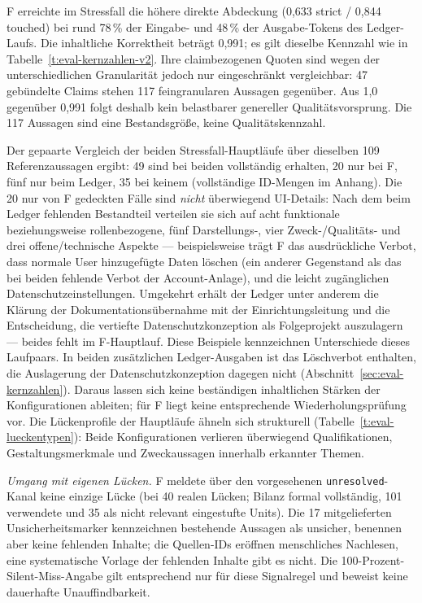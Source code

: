 F erreichte im Stressfall die höhere direkte Abdeckung
(0{,}633 strict / 0{,}844 touched) bei rund 78\,\% der Eingabe-
und 48\,\% der Ausgabe-Tokens des Ledger-Laufs. Die inhaltliche
Korrektheit beträgt 0{,}991; es gilt dieselbe Kennzahl wie in
Tabelle~\ref{t:eval-kernzahlen-v2}. Ihre claimbezogenen Quoten sind
wegen der unterschiedlichen Granularität jedoch nur eingeschränkt
vergleichbar: 47 gebündelte Claims stehen 117 feingranularen Aussagen
gegenüber. Aus 1{,}0 gegenüber 0{,}991 folgt deshalb kein belastbarer
genereller Qualitätsvorsprung. Die 117 Aussagen sind eine
Bestandsgröße, keine Qualitätskennzahl.

Der gepaarte Vergleich der beiden Stressfall-Hauptläufe über dieselben
109 Referenzaussagen ergibt: 49 sind bei beiden vollständig erhalten,
20 nur bei F, fünf nur beim Ledger, 35 bei keinem (vollständige
ID-Mengen im Anhang). Die 20 nur von F gedeckten Fälle sind
\emph{nicht} überwiegend UI-Details: Nach dem beim Ledger
fehlenden Bestandteil verteilen sie sich auf acht funktionale
beziehungsweise rollenbezogene, fünf Darstellungs-, vier
Zweck-/Qualitäts- und drei offene/technische Aspekte ---
beispielsweise trägt F das ausdrückliche Verbot, dass normale
User hinzugefügte Daten löschen (ein anderer Gegenstand als das
bei beiden fehlende Verbot der Account-Anlage), und die
leicht zugänglichen Datenschutzeinstellungen. Umgekehrt erhält
der Ledger unter anderem die Klärung der Dokumentationsübernahme
mit der Einrichtungsleitung und die Entscheidung, die vertiefte
Datenschutzkonzeption als Folgeprojekt auszulagern --- beides
fehlt im F-Hauptlauf. Diese Beispiele kennzeichnen Unterschiede
dieses Laufpaars. In beiden zusätzlichen Ledger-Ausgaben ist das
Löschverbot enthalten, die Auslagerung der Datenschutzkonzeption
dagegen nicht (Abschnitt~\ref{sec:eval-kernzahlen}). Daraus lassen
sich keine beständigen inhaltlichen Stärken der Konfigurationen
ableiten; für F liegt keine entsprechende Wiederholungsprüfung vor.
Die Lückenprofile der Hauptläufe ähneln sich strukturell
(Tabelle~\ref{t:eval-lueckentypen}): Beide Konfigurationen
verlieren überwiegend Qualifikationen, Gestaltungsmerkmale und
Zweckaussagen innerhalb erkannter Themen.



\emph{Umgang mit eigenen Lücken.} F meldete über den vorgesehenen \texttt{unresolved}-Kanal keine
einzige Lücke (bei 40 realen Lücken; Bilanz formal vollständig,
101 verwendete und 35 als nicht relevant eingestufte Units). Die
17 mitgelieferten Unsicherheitsmarker kennzeichnen bestehende
Aussagen als unsicher, benennen aber keine fehlenden Inhalte; die
Quellen-IDs eröffnen menschliches Nachlesen, eine systematische
Vorlage der fehlenden Inhalte gibt es nicht. Die
100-Prozent-Silent-Miss-Angabe gilt entsprechend nur für diese
Signalregel und beweist keine dauerhafte Unauffindbarkeit.


